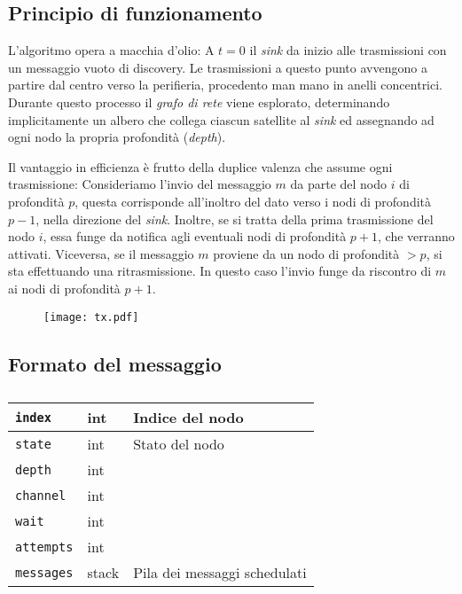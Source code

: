 \documentclass[a4paper,12pt]{article}
\theoremstyle{definition}
\begin{document}
\subsection{Principio di funzionamento}

L'algoritmo opera a macchia d'olio: A $t=0$ il \emph{sink} da inizio alle trasmissioni con un messaggio vuoto di discovery. Le trasmissioni a questo punto avvengono a partire dal centro verso la perifieria, procedento man mano in anelli concentrici. Durante questo processo il \emph{grafo di rete} viene esplorato, determinando implicitamente un albero che collega ciascun satellite al \emph{sink} ed assegnando ad ogni nodo la propria profondità (\emph{depth}).

Il vantaggio in efficienza è frutto della duplice valenza che assume ogni trasmissione: Consideriamo l'invio del messaggio $m$ da parte del nodo $i$ di profondità $p$, questa corrisponde all'inoltro del dato verso i nodi di profondità $p-1$, nella direzione del \emph{sink}. Inoltre, se si tratta della prima trasmissione del nodo $i$, essa funge da notifica agli eventuali nodi di profondità $p+1$, che verranno attivati. Viceversa, se il messaggio $m$ proviene da un nodo di profondità $> p$, si sta effettuando una ritrasmissione. In questo caso l'invio funge da riscontro di $m$ ai nodi di profondità $p+1$.

\begin{figure}[H]
\centering
\texttt{[image: tx.pdf]}
\caption{}
\end{figure}

\subsection{Formato del messaggio}

\begin{table}[H]
\centering
\begin{tabular}{| l | l | l |}
\hline
\texttt{index} & int & Indice del nodo \\ \hline
\texttt{state} & int & Stato del nodo \\ \hline
\texttt{depth} & int & \\ \hline
\texttt{channel} & int & \\ \hline
\texttt{wait} & int & \\ \hline
\texttt{attempts} & int & \\ \hline
\texttt{messages} & stack & Pila dei messaggi schedulati \\ \hline
\end{tabular}
\caption{}
\end{table}
\end{document}
